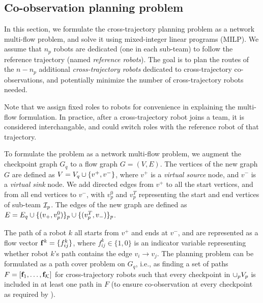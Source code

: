 \documentclass[10pt,twocolumn,twoside]{IEEEtran}
\begin{document}

\subsection{Co-observation planning problem}
In this section, we formulate the cross-trajectory planning problem as a network multi-flow problem, and solve it using mixed-integer linear programs (MILP). We assume that $n_p$ robots are dedicated (one in each sub-team) to follow the reference trajectory (named \emph{reference robots}). The goal is to plan the routes of the $n-n_p$ additional \emph{cross-trajectory robots} dedicated to cross-trajectory co-observations, and potentially minimize the number of cross-trajectory robots needed. 

\begin{remark}
Note that we assign fixed roles to robots for convenience in explaining the multi-flow formulation. In practice, after a cross-trajectory robot joins a team, it is considered interchangable, and could switch roles with the reference robot of that trajectory. %
\end{remark}

To formulate the problem as a network multi-flow problem, we augment the checkpoint graph $G_{q}$ to a flow graph $G=(V, E)$. The vertices of the new graph $G$ are defined as $V= V_{q} \cup \{v^{+},v^{-}\}$, where $v^{+}$ is a \emph{virtual source} node, and $v^{-}$ is a \emph{virtual sink} node. We add directed edges from $v^{+}$ to all the start vertices, and from all end vertices to $v^{-}$, with $v^0_p$ and $v^T_p$ representing the start and end vertices of sub-team $\mathcal{I}_p$. The edges of the new graph are defined as $E = E_{q} \cup \{(v_{+},v^{0}_{p})\}_{p} \cup \{( v^{T}_{p},v_{-})\}_{p}$.

The path of a robot $k$ all starts from $v^{+}$ and ends at $v^{-}$, and are represented as a flow vector $\mathbf{f}^{k} = \{ f^{k}_{ij} \}$, where $f^{k}_{ij} \in \{1,0\}$ is an indicator variable representing whether robot $k$'s path contains the edge $v_{i}\to v_{j}$. The planning problem can be formulated as a path cover problem on $G_{q}$, i.e., as finding a set of paths $F=[\mathbf{f}_{1},\dots, \mathbf{f}_{\mathcal{K}}]$ for cross-trajectory robots such that every checkpoint in $\cup_p V_{p}$ is included in at least one path in $F$ (to ensure co-observation at every checkpoint as required by ). %
\end{document}
